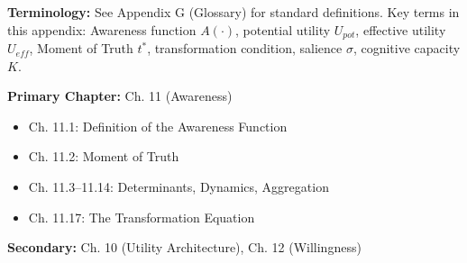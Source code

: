 \begin{tcolorbox}[colback=gray!5!white, colframe=gray!50!black]
\textbf{Terminology:} See Appendix G (Glossary) for standard definitions.
Key terms in this appendix: Awareness function $A(\cdot)$, potential utility $U_{pot}$,
effective utility $U_{eff}$, Moment of Truth $t^*$, transformation condition,
salience $\sigma$, cognitive capacity $K$.
\end{tcolorbox}

\begin{tcolorbox}[colback=blue!5!white, colframe=blue!50!black, title=Chapter Linkage]
\textbf{Primary Chapter:} Ch. 11 (Awareness)
\begin{itemize}[nosep]
    \item Ch. 11.1: Definition of the Awareness Function
    \item Ch. 11.2: Moment of Truth
    \item Ch. 11.3--11.14: Determinants, Dynamics, Aggregation
    \item Ch. 11.17: The Transformation Equation
\end{itemize}
\textbf{Secondary:} Ch. 10 (Utility Architecture), Ch. 12 (Willingness)
\end{tcolorbox}

